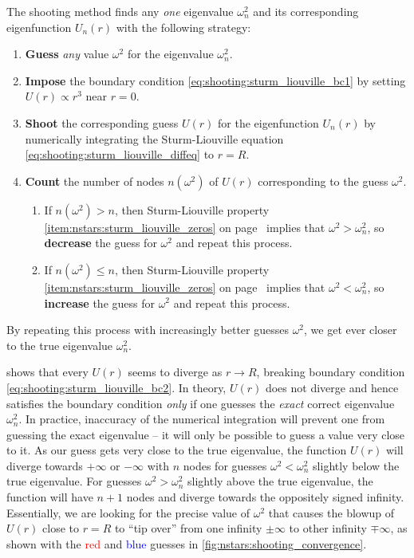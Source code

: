 The shooting method finds any \emph{one} eigenvalue $\omega_n^2$ and its corresponding eigenfunction $U_n(r)$ with the following strategy:
\begin{enumerate}
\item \textbf{Guess} \emph{any} value $\omega^2$ for the eigenvalue $\omega_n^2$.
\item \textbf{Impose} the boundary condition \eqref{eq:shooting:sturm_liouville_bc1} by setting $U(r) \propto r^3$ near $r = 0$. \label{item:shooting:bc1}
\item \textbf{Shoot} the corresponding guess $U(r)$ for the eigenfunction $U_n(r)$ by numerically integrating the Sturm-Liouville equation \eqref{eq:shooting:sturm_liouville_diffeq} to $r=R$. \label{item:shooting:shoot}
\item \textbf{Count} the number of nodes $n(\omega^2)$ of $U(r)$ corresponding to the guess $\omega^2$.
      \begin{enumerate}
      \item If $n(\omega^2) > n$, then Sturm-Liouville property \ref{item:nstars:sturm_liouville_zeros} on page~\pageref{item:nstars:sturm_liouville_zeros} implies that $\omega^2 > \omega_n^2$, so \textbf{decrease} the guess for $\omega^2$ and repeat this process. \label{item:shooting:count_decrease}
      \item If $n(\omega^2) \leq n$, then Sturm-Liouville property \ref{item:nstars:sturm_liouville_zeros} on page~\pageref{item:nstars:sturm_liouville_zeros} implies that $\omega^2 < \omega_n^2$, so \textbf{increase} the guess for $\omega^2$ and repeat this process. \label{item:shooting:count_increase}
      \end{enumerate}
      \label{item:shooting:count}
\end{enumerate}
By repeating this process with increasingly better guesses $\omega^2$, we get ever closer to the true eigenvalue $\omega_n^2$.

 shows that every $U(r)$ seems to diverge as $r \rightarrow R$, breaking boundary condition \eqref{eq:shooting:sturm_liouville_bc2}.
In theory, $U(r)$ does not diverge and hence satisfies the boundary condition \emph{only} if one guesses the \emph{exact} correct eigenvalue $\omega_n^2$.
In practice, inaccuracy of the numerical integration will prevent one from guessing the exact eigenvalue -- it will only be possible to guess a value very close to it.
As our guess gets very close to the true eigenvalue, the function $U(r)$ will diverge towards $+\infty$ or $-\infty$ with $n$ nodes for guesses $\omega^2 < \omega_n^2$ slightly below the true eigenvalue.
For guesses $\omega^2 > \omega_n^2$ slightly above the true eigenvalue, the function will have $n+1$ nodes and diverge towards the oppositely signed infinity.
Essentially, we are looking for the precise value of $\omega^2$ that causes the blowup of $U(r)$ close to $r=R$ to ``tip over'' from one infinity $\pm \infty$ to other infinity $\mp \infty$, as shown with the \textcolor{red}{red} and \textcolor{blue}{blue} guesses in \cref{fig:nstars:shooting_convergence}.

